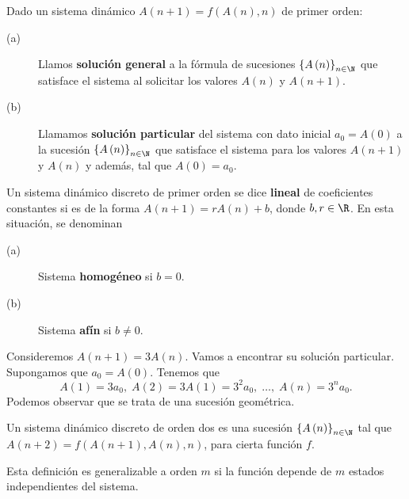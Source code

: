 \begin{fdefinition}[]
\normalfont Dado un sistema dinámico $\displaystyle A\left(n+1\right) = f\left(A\left(n\right),n\right) $ de primer orden:
\begin{description}
	\item[(a)] Llamos \textbf{solución general} a la fórmula de sucesiones $\displaystyle \left\{ A\left(n\right)\right\} _{n\in\N} $ que satisface el sistema al solicitar los valores $\displaystyle A\left(n\right) $ y $\displaystyle A\left(n+1\right) $.
	\item[(b)] Llamamos \textbf{solución particular} del sistema con dato inicial $\displaystyle a_{0} = A\left(0\right) $ a la sucesión $\displaystyle \left\{ A\left(n\right)\right\} _{n\in\N} $ que satisface el sistema para los valores $\displaystyle A\left(n+1\right) $ y $\displaystyle A\left(n\right) $ y además, tal que $\displaystyle A\left(0\right) = a_{0} $.
\end{description}
\end{fdefinition}
\begin{fdefinition}
\normalfont Un sistema dinámico discreto de primer orden se dice \textbf{lineal} de coeficientes constantes si es de la forma $\displaystyle A\left(n+1\right) = rA\left(n\right) + b $, donde $\displaystyle b,r \in \R $. En esta situación, se denominan
\begin{description}
\item[(a)] Sistema \textbf{homogéneo} si $\displaystyle b = 0 $.
\item[(b)] Sistema \textbf{afín} si $\displaystyle b \neq 0 $.
\end{description}
\end{fdefinition}
\begin{eg}
\normalfont Consideremos $\displaystyle A\left(n+1\right) = 3A\left(n\right) $. Vamos a encontrar su solución particular. Supongamos que $\displaystyle a_{0} = A\left(0\right) $. Tenemos que 
\[A\left(1\right) = 3a_{0}, \; A\left(2\right) = 3A\left(1\right) = 3^{2}a_{0}, \; \ldots, \; A\left(n\right) = 3^{n}a_{0}.\]
Podemos observar que se trata de una sucesión geométrica. 
\end{eg}
\begin{fdefinition}[]
	\normalfont Un sistema dinámico discreto de orden dos es una sucesión $\displaystyle \left\{ A\left(n\right)\right\} _{n\in\N} $ tal que $\displaystyle A\left(n+2\right) = f\left(A\left(n+1\right), A\left(n\right), n\right) $, para cierta función $\displaystyle f $. 
\end{fdefinition}
\begin{observation}
\normalfont Esta definición es generalizable a orden $\displaystyle m $ si la función depende de $\displaystyle m $ estados independientes del sistema.
\end{observation}
